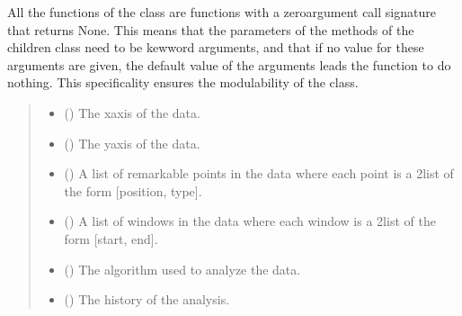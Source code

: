 \documentclass[letterpaper,10pt,english]{sphinxmanual}
\begin{document}
\begin{fulllineitems}
All the functions of the class are functions with a zero\sphinxhyphen{}argument call signature that returns None. This means that the parameters of the methods of the children class need to be kew\sphinxhyphen{}word arguments, and that if no value for these arguments are given, the default value of the arguments leads the function to do nothing. This specificality ensures the modulability of the class.
\begin{quote}\begin{description}
\begin{itemize}
\item {} 
\sphinxAtStartPar
{} () \textendash{} The x\sphinxhyphen{}axis of the data.

\item {} 
\sphinxAtStartPar
{} () \textendash{} The y\sphinxhyphen{}axis of the data.

\item {} 
\sphinxAtStartPar
{} () \textendash{} A list of remarkable points in the data where each point is a 2\sphinxhyphen{}list of the form {[}position, type{]}.

\item {} 
\sphinxAtStartPar
{} () \textendash{} A list of windows in the data where each window is a 2\sphinxhyphen{}list of the form {[}start, end{]}.

\item {} 
\sphinxAtStartPar
{} () \textendash{} The algorithm used to analyze the data.

\item {} 
\sphinxAtStartPar
{} () \textendash{} The history of the analysis.

\end{itemize}

\end{description}\end{quote}

\end{fulllineitems}
\end{document}
